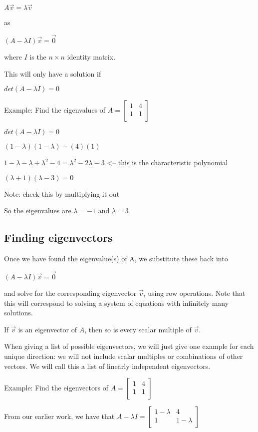 \documentclass{extarticle}
\begin{document}
$A\vec{v}=\lambda\vec{v}$

as

$\left(A-\lambda I\right)\vec{v}=\vec{0}$

where $I$ is the $n\times n$ identity matrix.

This will only have a solution if

$det\left(A-\lambda I\right)=0$

Example: Find the eigenvalues of $A=\left[\begin{matrix}1&4\\1&1\\\end{matrix}\right]$

$det\left(A-\lambda I\right)=0$

$(1-\lambda)(1-\lambda)-(4)(1)$

$1-\lambda-\lambda+\lambda^2-4=\lambda^2-2\lambda-3$ <-- this is the characteristic polynomial

$(\lambda+1)(\lambda-3)=0$

Note: check this by multiplying it out

So the eigenvalues are $\lambda=-1$ and $\lambda=3$


\subsection{Finding eigenvectors}
Once we have found the eigenvalue(s) of A, we substitute these back into

$\left(A-\lambda I\right)\vec{v}=\vec{0}$

and solve for the corresponding eigenvector $\vec{v}$, using row operations.
Note that this will correspond to solving a system of equations with infinitely many solutions.


If $\vec{v}$ is an eigenvector of $A$, then so is every scalar multiple of $\vec{v}$.

When giving a list of possible eigenvectors, we will just give one example for each unique direction: we will not include scalar multiples or combinations of other vectors. We will call this a list of linearly independent eigenvectors.


Example: Find the eigenvectors of $A=\left[\begin{matrix}1&4\\1&1\\\end{matrix}\right]$

From our earlier work, we have that $A-\lambda I=\left[\begin{matrix}1-\lambda&4\\1&1-\lambda\\\end{matrix}\right]$
\end{document}
